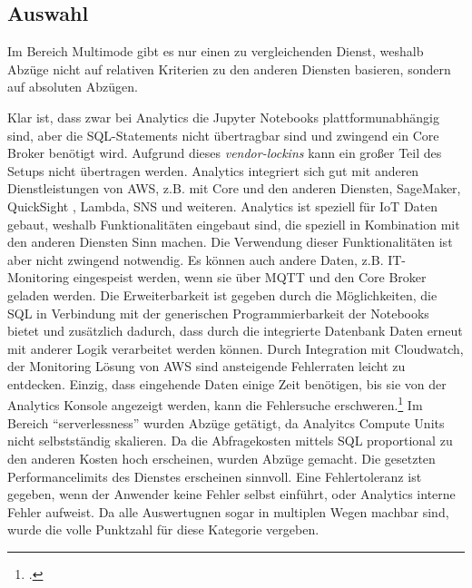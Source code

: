 \subsection{Auswahl}
Im Bereich Multimode gibt es nur einen zu vergleichenden Dienst, weshalb Abzüge nicht auf relativen Kriterien zu den anderen Diensten basieren, sondern auf absoluten Abzügen.

Klar ist, dass zwar bei \AWSIOT{} Analytics die Jupyter Notebooks plattformunabhängig sind, aber die \ac{SQL}-Statements nicht übertragbar sind und zwingend ein \AWSIOT{} Core Broker benötigt wird. Aufgrund dieses \textit{vendor-lockins} kann ein großer Teil des Setups nicht übertragen werden.
\AWSIOT{} Analytics integriert sich gut mit anderen Dienstleistungen von AWS, z.B. mit \AWSIOT{} Core und den anderen \AWSIOT{} Diensten, SageMaker, QuickSight , Lambda, \ac{SNS} und weiteren.
\AWSIOT{} Analytics ist speziell für \ac{IoT} Daten gebaut, weshalb Funktionalitäten eingebaut sind, die speziell in Kombination mit den anderen \AWSIOT{} Diensten Sinn machen. Die Verwendung dieser Funktionalitäten ist aber nicht zwingend notwendig. Es können auch andere Daten, z.B. IT-Monitoring eingespeist werden, wenn sie über \ac{MQTT} und den \AWSIOT{} Core Broker geladen werden.
Die Erweiterbarkeit ist gegeben durch die Möglichkeiten, die \ac{SQL} in Verbindung mit der generischen Programmierbarkeit der Notebooks bietet und zusätzlich dadurch, dass durch die integrierte Datenbank Daten erneut mit anderer Logik verarbeitet werden können.
Durch Integration mit Cloudwatch, der Monitoring Lösung von \ac{AWS} sind ansteigende Fehlerraten leicht zu entdecken. Einzig, dass eingehende Daten einige Zeit benötigen, bis sie von der \AWSIOT{} Analytics Konsole angezeigt werden, kann die Fehlersuche erschweren.\footcite[Vgl.][]{AmazonWebServicesInc..o.J.aw}
Im Bereich \enquote{serverlessness} wurden Abzüge getätigt, da Analyitcs Compute Units nicht selbstständig skalieren.
Da die Abfragekosten mittels \ac{SQL} proportional zu den anderen Kosten hoch erscheinen, wurden Abzüge gemacht.
Die gesetzten Performancelimits des Dienstes erscheinen sinnvoll. Eine Fehlertoleranz ist gegeben, wenn der Anwender keine Fehler selbst einführt, oder \AWSIOT{} Analytics interne Fehler aufweist. Da alle Auswertugnen sogar in multiplen Wegen machbar sind, wurde die volle Punktzahl für diese Kategorie vergeben.



